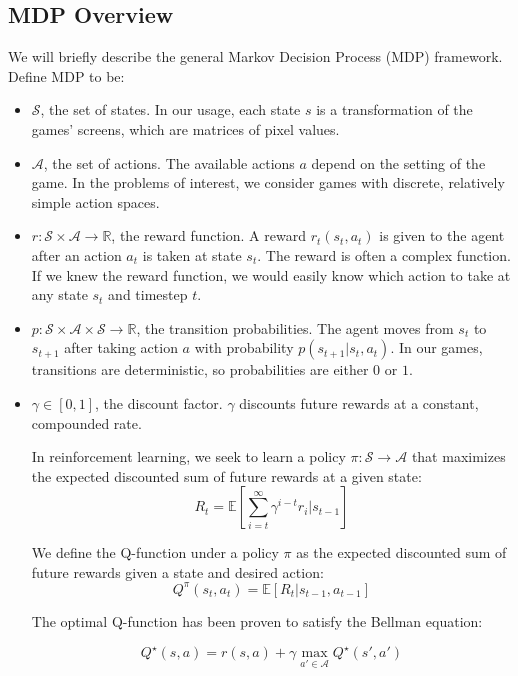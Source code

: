 \documentclass[11pt]{article}
\begin{document}
\subsection{MDP Overview}

We will briefly describe the general Markov Decision Process (MDP)
framework. Define MDP to be:

\begin{itemize}
\item $\mathcal{S}$, the set of states. In our usage, each state $s$
is a transformation of the games' screens, which are matrices of pixel
values.
  
\item $\mathcal{A}$, the set of actions. The available actions $a$
depend on the setting of the game. In the problems of interest, we
consider games with discrete, relatively simple action spaces.
  
\item $r: \mathcal{S} \times \mathcal{A} \to \mathbb{R}$, the reward
function. A reward $r_t(s_t, a_t)$ is given to the agent after an
action $a_t$ is taken at state $s_t$. The reward is often a complex
function. If we knew the reward function, we would easily know which
action to take at any state $s_t$ and timestep $t$.
  
\item $p: \mathcal{S} \times \mathcal{A} \times \mathcal{S} \to
\mathbb{R}$, the transition probabilities. The agent moves from $s_t$
to $s_{t+1}$ after taking action $a$ with probability $p(s_{t+1} |s_t,
a_t)$. In our games, transitions are deterministic, so probabilities
are either $0$ or $1$.
  
\item $\gamma \in [0, 1]$, the discount factor. $\gamma$ discounts
  future rewards at a constant, compounded rate.

  In reinforcement learning, we seek to learn a policy
  $\pi: \mathcal{S} \to \mathcal{A}$ that maximizes the expected
  discounted sum of future rewards at a given
  state:
  $$R_t = \mathbb{E}\left[\sum_{i=t}^\infty \gamma^{i-t} r_{i}|s_{t-1}\right]$$

  We define the Q-function under a policy $\pi$ as the expected
  discounted sum of future rewards given a state and desired action:
  $$Q^\pi(s_t, a_t) = \mathbb{E}\left[R_t | s_{t-1}, a_{t-1} \right]$$

  The optimal Q-function has been proven to satisfy the Bellman equation:

  $$Q^\star (s, a) = r(s, a) + \gamma \max_{a' \in \mathcal{A}} Q^\star(s', a')$$
\end{itemize}
\end{document}
